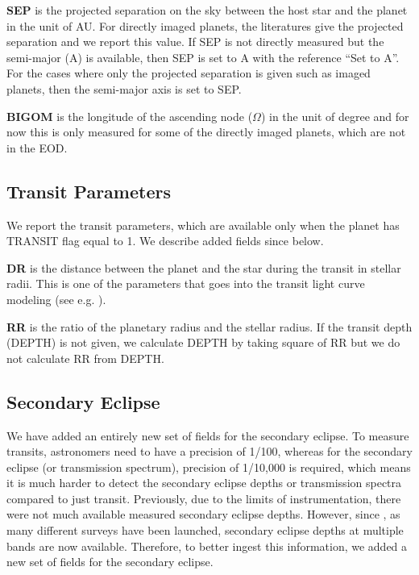 \documentclass[11pt,preprint]{aastex}
\begin{document}
\begin{CJK*}{UTF8}{gbsn}
{\bf SEP} is the projected separation on the sky between the host star and the planet in the unit of AU. For directly imaged planets, the literatures give the projected separation and we report this value. 
If SEP is  not directly measured but the semi-major (A) is available, then SEP is set to A with the reference ``Set to A''. For the cases where only the projected separation is given such as imaged planets, then the semi-major axis is set to SEP. 

{\bf BIGOM} is the longitude of the ascending node ($\Omega$) in the unit of degree and for now this is only measured for some of the directly imaged planets, which are not in the EOD. 




\subsection{Transit Parameters}
We report the transit parameters, which are available only when the planet has TRANSIT flag equal to 1. We describe added fields since \cite{Wright2011} below. 

{\bf DR} is the distance between the planet and the star during the transit in stellar radii. This is one of the parameters that goes into the transit light curve modeling (see e.g. \citealt{Batalha2013}). 

{\bf RR} is the ratio of the planetary radius and the stellar radius. If the transit depth (DEPTH) is not given, we calculate DEPTH by taking square of RR but we do not calculate RR from DEPTH.  


\subsection{Secondary Eclipse}
We have added an entirely new set of fields for the secondary eclipse. To measure transits, astronomers need to have a precision of 1/100, whereas for the secondary eclipse (or transmission spectrum), precision of 1/10,000 is required, which means it is much harder to detect the secondary eclipse depths or transmission spectra compared to just transit. Previously, due to the limits of instrumentation, there were not much available measured secondary eclipse depths. However, since \cite{Wright2011}, as many different surveys have been launched, secondary eclipse depths at multiple bands are now available. Therefore, to better ingest this information, we added a new set of fields for the secondary eclipse. 


\end{CJK*}
\end{document}
